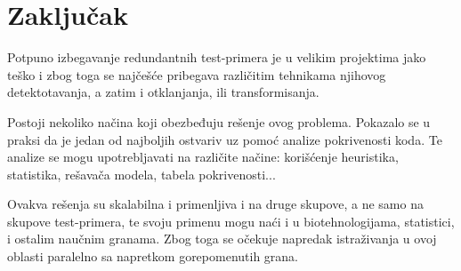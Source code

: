 \documentclass[a4paper]{article}
\begin{document}
\section{Zaključak}
\label{sec:zakljucak}
Potpuno izbegavanje redundantnih test-primera je u velikim projektima jako teško i zbog toga se najčešće pribegava različitim tehnikama njihovog detektotavanja, a zatim i otklanjanja, ili transformisanja.

Postoji nekoliko načina koji obezbeđuju rešenje ovog problema. Pokazalo se u praksi da je jedan od najboljih ostvariv uz pomoć analize pokrivenosti koda. Te analize se mogu upotrebljavati na različite načine: korišćenje heuristika, statistika, rešavača modela, tabela pokrivenosti...

Ovakva rešenja su skalabilna i primenljiva i na druge skupove, a ne samo na skupove test-primera, te svoju primenu mogu naći i u biotehnologijama, statistici, i ostalim naučnim granama. Zbog toga se očekuje napredak istraživanja u ovoj oblasti paralelno sa napretkom gorepomenutih grana.

\appendix
 

\end{document}
